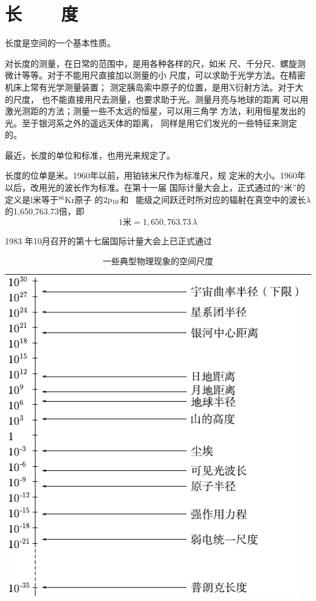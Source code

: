 \section[长度]{长~~~~度}\label{sec:01.03}

长度是空间的一个基本性质。

对长度的测量，在日常的范围中，是用各种各样的尺，如米
尺、千分尺、螺旋测微计等等。对于不能用尺直接加以测量的小
尺度，可以求助于光学方法。在精密机床上常有光学测量装置；
测定胰岛索中原子的位置，是用X衍射方法。对于大的尺度，
也不能直接用尺去测量，也要求助于光。测量月亮与地球的距离
可以用激光测距的方法；测量一些不太远的恒星，可以用三角学
方法，利用恒星发出的光。至于银河系之外的遥远天体的距离，
同样是用它们发光的一些特征来测定的。

最近，长度的单位和标准，也用光来规定了。

长度的位单是米。1960年以前，用铂铱米尺作为标准尺，规
定米的大小。1960年以后，改用光的波长作为标准。在第十一届
国际计量大会上，正式通过的“米”的定义是l米等于$^{86}$Kr原子
的$2\rm{p}_{10}$和~
能级之间跃迁时所对应的辐射在真空中的波长$\lambda$的1,650,763.73倍，即
\begin{equation*}
    1 \text{米} = 1,650,763.73 \, \lambda
\end{equation*}


1983 年10月召开的第十七届国际计量大会上已正式通过
\\
\begin{table}[!h]
    \centering
    \caption{一些典型物理现象的空间尺度}
    \label{tab:01.03}
    \begin{tabular*}{\linewidth}{>{\centering}m{\linewidth}c}
        \toprule
        \includegraphics[width=0.8\linewidth]{figure/tab01.03} & \\
        \bottomrule
    \end{tabular*}
\end{table}
\clearpage

